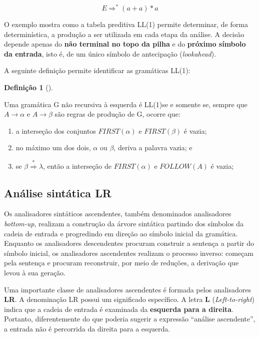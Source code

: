 \documentclass[
  brazilian,
  letterpaper,
]{book}
\theoremstyle{plain}
\theoremstyle{definition}
\newtheorem{definition}{Definição}[chapter]
\theoremstyle{remark}
\begin{document}
\[
\boxed{E\Rightarrow^*(a+a)*a}
\]

O exemplo mostra como a tabela preditiva LL(1) permite determinar, de
forma determinística, a produção a ser utilizada em cada etapa da
análise. A decisão depende apenas do \textbf{não terminal no topo da
pilha} e do \textbf{próximo símbolo da entrada}, isto é, de um único
símbolo de antecipação (\emph{lookahead}).

A seguinte definição permite identificar as gramáticas LL(1):

\begin{definition}[]\protect\hypertarget{def-gll}{}\label{def-gll}

Uma gramática G não recursiva à esquerda é LL(1)se e somente se, sempre
que \(A \rightarrow \alpha\) e \(A \rightarrow \beta\) são regras de
produção de G, ocorre que:

\begin{enumerate}
\def\labelenumi{\arabic{enumi}.}
\item
  a interseção dos conjuntos \(FIRST(\alpha)\) e \(FIRST(\beta)\) é
  vazia;
\item
  no máximo um dos dois, \(\alpha\) ou \(\beta\), deriva a palavra
  vazia; e
\item
  se \(\beta \overset{*}{\Rightarrow} \lambda\), então a interseção de
  \(FIRST(\alpha)\) e \(FOLLOW(A)\) é vazia;
\end{enumerate}

\end{definition}

\subsection{Análise sintática LR}\label{anuxe1lise-sintuxe1tica-lr}

Os analisadores sintáticos ascendentes, também denominados analisadores
\emph{bottom-up}, realizam a construção da árvore sintática partindo dos
símbolos da cadeia de entrada e progredindo em direção ao símbolo
inicial da gramática. Enquanto os analisadores descendentes procuram
construir a sentença a partir do símbolo inicial, os analisadores
ascendentes realizam o processo inverso: começam pela sentença e
procuram reconstruir, por meio de reduções, a derivação que levou à sua
geração.

Uma importante classe de analisadores ascendentes é formada pelos
analisadores \textbf{LR}. A denominação LR possui um significado
específico. A letra \textbf{L} (\emph{Left-to-right}) indica que a
cadeia de entrada é examinada da \textbf{esquerda para a direita}.
Portanto, diferentemente do que poderia sugerir a expressão ``análise
ascendente'', a entrada não é percorrida da direita para a esquerda.
\end{document}
